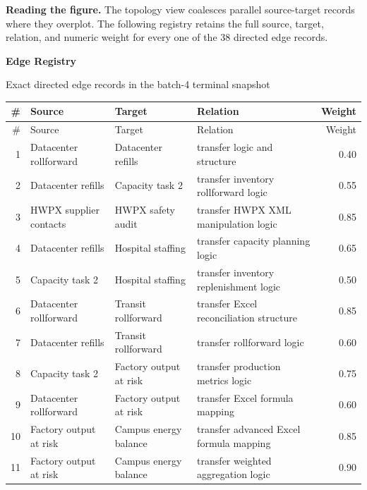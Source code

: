 \documentclass[10pt,landscape]{article}
\begin{document}
\vfill
\noindent\footnotesize
\textbf{Reading the figure.} The topology view coalesces parallel source-target records where they overplot. The following registry retains the full source, target, relation, and numeric weight for every one of the 38 directed edge records.

\newpage
\begin{center}
  {\Large\bfseries Edge Registry}\par
  \vspace{2pt}
  {\small Exact directed edge records in the batch-4 terminal snapshot}
\end{center}
\vspace{5pt}
\footnotesize
\renewcommand{\arraystretch}{1.12}
\begin{longtable}{@{}r >{\raggedright\arraybackslash}p{3.35cm} >{\raggedright\arraybackslash}p{3.35cm} >{\raggedright\arraybackslash}p{4.75cm} r@{}}
\toprule
\# & Source & Target & Relation & Weight \\
\midrule
\endfirsthead
\toprule
\# & Source & Target & Relation & Weight \\
\midrule
\endhead
1 & Datacenter rollforward & Datacenter refills & transfer logic and structure & 0.40 \\
2 & Datacenter refills & Capacity task 2 & transfer inventory rollforward logic & 0.55 \\
3 & HWPX supplier contacts & HWPX safety audit & transfer HWPX XML manipulation logic & 0.85 \\
4 & Datacenter refills & Hospital staffing & transfer capacity planning logic & 0.65 \\
5 & Capacity task 2 & Hospital staffing & transfer inventory replenishment logic & 0.50 \\
6 & Datacenter rollforward & Transit rollforward & transfer Excel reconciliation structure & 0.85 \\
7 & Datacenter refills & Transit rollforward & transfer rollforward logic & 0.60 \\
8 & Capacity task 2 & Factory output at risk & transfer production metrics logic & 0.75 \\
9 & Datacenter rollforward & Factory output at risk & transfer Excel formula mapping & 0.60 \\
10 & Factory output at risk & Campus energy balance & transfer advanced Excel formula mapping & 0.85 \\
11 & Factory output at risk & Campus energy balance & transfer weighted aggregation logic & 0.90 \\

\end{longtable}
\end{document}
